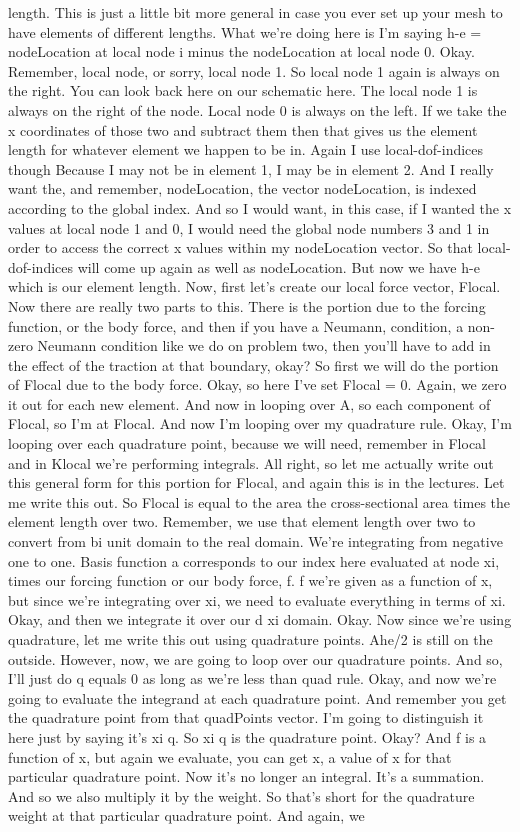 \documentclass[10pt]{article}
\begin{document}
{length. This is just a little bit more general in case you ever set up your mesh to have elements of different lengths. What we're doing here is I'm saying h-e = nodeLocation at local node i minus the nodeLocation at local node 0. Okay. Remember, local node, or sorry, local node 1. So local node 1 again is always on the right. You can look back here on our schematic here. The local node 1 is always on the right of the node. Local node 0 is always on the left. If we take the x coordinates of those two and subtract them then that gives us the element length for whatever element we happen to be in. Again I use local-dof-indices though Because I may not be in element 1, I may be in element 2. And I really want the, and remember, nodeLocation, the vector nodeLocation, is indexed according to the global index. And so I would want, in this case, if I wanted the x values at local node 1 and 0, I would need the global node numbers 3 and 1 in order to access the correct x values within my nodeLocation vector. So that local-dof-indices will come up again as well as nodeLocation. But now we have h-e which is our element length. Now, first let's create our local force vector, Flocal. Now there are really two parts to this. There is the portion due to the forcing function, or the body force, and then if you have a Neumann, condition, a non-zero Neumann condition like we do on problem two, then you'll have to add in the effect of the traction at that boundary, okay? So first we will do the portion of Flocal due to the body force. Okay, so here I've set Flocal = 0. Again, we zero it out for each new element. And now in looping over A, so each component of Flocal, so I'm at Flocal. And now I'm looping over my quadrature rule. Okay, I'm looping over each quadrature point, because we will need, remember in Flocal and in Klocal we're performing integrals. All right, so let me actually write out this general form for this portion for Flocal, and again this is in the lectures. Let me write this out. So Flocal is equal to the area the cross-sectional area times the element length over two. Remember, we use that element length over two to convert from bi unit domain to the real domain. We're integrating from negative one to one. Basis function a corresponds to our index here evaluated at node xi, times our forcing function or our body force, f. f we're given as a function of x, but since we're integrating over xi, we need to evaluate everything in terms of xi. Okay, and then we integrate it over our d xi domain. Okay. Now since we're using quadrature, let me write this out using quadrature points. Ahe/2 is still on the outside. However, now, we are going to loop over our quadrature points. And so, I'll just do q equals 0 as long as we're less than quad rule. Okay, and now we're going to evaluate the integrand at each quadrature point. And remember you get the quadrature point from that quadPoints vector. I'm going to distinguish it here just by saying it's xi q. So xi q is the quadrature point. Okay? And f is a function of x, but again we evaluate, you can get x, a value of x for that particular quadrature point. Now it's no longer an integral. It's a summation. And so we also multiply it by the weight. So that's short for the quadrature weight at that particular quadrature point. And again, we }
\end{document}

